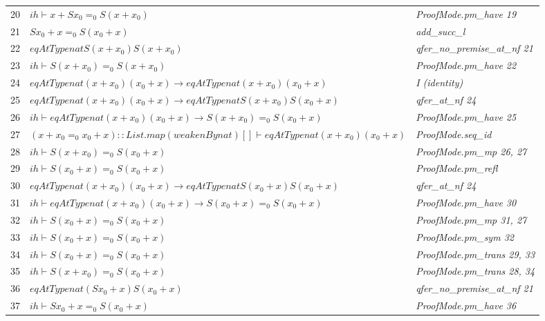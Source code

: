 \begin{longtable}{r l l}
20 & $ih  \vdash  x  +  S x_{0}  =_0  S (x  +  x_{0})$ & \textit{ProofMode.pm\_have 19} \\
21 & $S x_{0}  +  x  =_0  S (x_{0}  +  x)$ & \textit{add\_succ\_l} \\
22 & $eqAtType nat S (x  +  x_{0}) S (x  +  x_{0})$ & \textit{qfer\_no\_premise\_at\_nf 21} \\
23 & $ih  \vdash  S (x  +  x_{0})  =_0  S (x  +  x_{0})$ & \textit{ProofMode.pm\_have 22} \\
24 & $eqAtType nat (x  +  x_{0}) (x_{0}  +  x)  \to  eqAtType nat (x  +  x_{0}) (x_{0}  +  x)$ & \textit{I (identity)} \\
25 & $eqAtType nat (x  +  x_{0}) (x_{0}  +  x)  \to  eqAtType nat S (x  +  x_{0}) S (x_{0}  +  x)$ & \textit{qfer\_at\_nf 24} \\
26 & $ih  \vdash  eqAtType nat (x  +  x_{0}) (x_{0}  +  x)  \to  S (x  +  x_{0})  =_0  S (x_{0}  +  x)$ & \textit{ProofMode.pm\_have 25} \\
27 & $(x  +  x_{0}  =_0  x_{0}  +  x) :: List.map (weakenBy nat) []  \vdash  eqAtType nat (x  +  x_{0}) (x_{0}  +  x)$ & \textit{ProofMode.seq\_id} \\
28 & $ih  \vdash  S (x  +  x_{0})  =_0  S (x_{0}  +  x)$ & \textit{ProofMode.pm\_mp 26, 27} \\
29 & $ih  \vdash  S (x_{0}  +  x)  =_0  S (x_{0}  +  x)$ & \textit{ProofMode.pm\_refl} \\
30 & $eqAtType nat (x  +  x_{0}) (x_{0}  +  x)  \to  eqAtType nat S (x_{0}  +  x) S (x_{0}  +  x)$ & \textit{qfer\_at\_nf 24} \\
31 & $ih  \vdash  eqAtType nat (x  +  x_{0}) (x_{0}  +  x)  \to  S (x_{0}  +  x)  =_0  S (x_{0}  +  x)$ & \textit{ProofMode.pm\_have 30} \\
32 & $ih  \vdash  S (x_{0}  +  x)  =_0  S (x_{0}  +  x)$ & \textit{ProofMode.pm\_mp 31, 27} \\
33 & $ih  \vdash  S (x_{0}  +  x)  =_0  S (x_{0}  +  x)$ & \textit{ProofMode.pm\_sym 32} \\
34 & $ih  \vdash  S (x_{0}  +  x)  =_0  S (x_{0}  +  x)$ & \textit{ProofMode.pm\_trans 29, 33} \\
35 & $ih  \vdash  S (x  +  x_{0})  =_0  S (x_{0}  +  x)$ & \textit{ProofMode.pm\_trans 28, 34} \\
36 & $eqAtType nat (S x_{0}  +  x) S (x_{0}  +  x)$ & \textit{qfer\_no\_premise\_at\_nf 21} \\
37 & $ih  \vdash  S x_{0}  +  x  =_0  S (x_{0}  +  x)$ & \textit{ProofMode.pm\_have 36} \\

\end{longtable}

